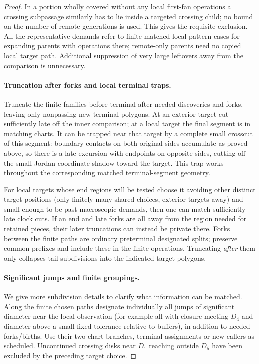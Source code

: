 \begin{proof}
In a portion wholly covered
without any local first-fan operations a crossing subpassage similarly has to lie inside a targeted crossing
child; no bound on the number of remote generations is used. This gives the requisite exclusion. All the
representative demands refer to finite matched local-pattern cases for expanding parents with operations
there; remote-only parents need no copied local target path. Additional suppression of very large leftovers
away from the comparison is unnecessary.

\paragraph{Truncation after forks and local terminal traps.}

Truncate the finite families before terminal after needed discoveries and forks, leaving only nonpassing new
terminal polygons. At an exterior target cut sufficiently late off the inner comparison; at a local target
the final segment is in matching charts. It can be trapped near that target by a complete small crosscut of
this segment: boundary contacts on both original sides accumulate as proved above, so there is a late
excursion with endpoints on opposite sides, cutting off the small Jordan-coordinate shadow toward the
target. This trap works throughout the corresponding matched terminal-segment geometry.

For local targets
whose end regions will be tested choose it avoiding other distinct target positions (only finitely many
shared choices, exterior targets away) and small enough to be past macroscopic demands, then one can match
sufficiently late clock cuts. If an end and late forks are all away from the region needed for retained
pieces, their later truncations can instead be private there. Forks between the finite paths are ordinary
preterminal designated splits; preserve common prefixes and include these in the finite operations.
Truncating \emph{after} them only collapses tail subdivisions into the indicated target polygons.

\paragraph{Significant jumps and finite groupings.}

We give more subdivision details to clarify what information can be matched. Along the finite chosen paths
designate individually all jumps of significant diameter near the local observation (for example all with
closure meeting \(\overline D_4\) and diameter above a small fixed tolerance relative to buffers), in
addition to needed forks/births. Use their two chart branches, terminal assignments or new callers as
scheduled. Uncontinued crossing disks near \(D_1\) reaching outside \(D_5\) have been excluded by the
preceding target choice.


\end{proof}
